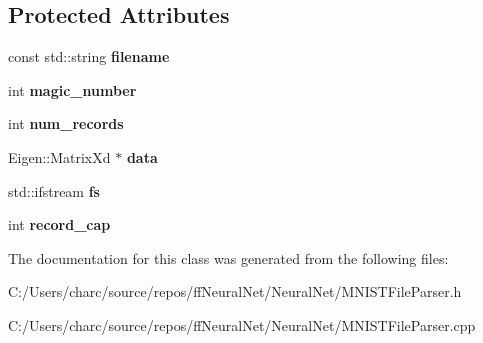 \subsection*{Protected Attributes}
\begin{DoxyCompactItemize}
\item 
\mbox{\label{class_m_n_i_s_t_file_parser_a40515ef5800bb10620ab6cac6c994750}} 
const std\+::string {\bfseries filename}
\item 
\mbox{\label{class_m_n_i_s_t_file_parser_a658bfcf8d881bc2a6c9e73ae13be7fa4}} 
int {\bfseries magic\+\_\+number}
\item 
\mbox{\label{class_m_n_i_s_t_file_parser_a2d6456b4f107c05afd748ad5ae5dfda3}} 
int {\bfseries num\+\_\+records}
\item 
\mbox{\label{class_m_n_i_s_t_file_parser_aa51099df794558d800bc45952a96b072}} 
Eigen\+::\+Matrix\+Xd $\ast$ {\bfseries data}
\item 
\mbox{\label{class_m_n_i_s_t_file_parser_a6d7f525b818599dd33748e941453cdcc}} 
std\+::ifstream {\bfseries fs}
\item 
\mbox{\label{class_m_n_i_s_t_file_parser_a9dc6f336f0c71750f8118905edc23c47}} 
int {\bfseries record\+\_\+cap}
\end{DoxyCompactItemize}


The documentation for this class was generated from the following files\+:\begin{DoxyCompactItemize}
\item 
C\+:/\+Users/charc/source/repos/ff\+Neural\+Net/\+Neural\+Net/M\+N\+I\+S\+T\+File\+Parser.\+h\item 
C\+:/\+Users/charc/source/repos/ff\+Neural\+Net/\+Neural\+Net/M\+N\+I\+S\+T\+File\+Parser.\+cpp\end{DoxyCompactItemize}
